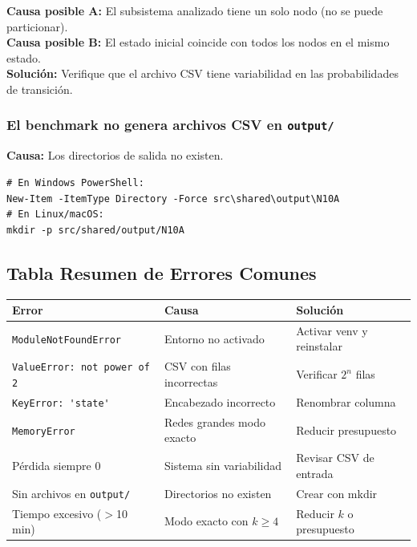 \textbf{Causa posible A:} El subsistema analizado tiene un solo nodo (no se puede particionar).\\
\textbf{Causa posible B:} El estado inicial coincide con todos los nodos en el mismo estado. \\
\textbf{Solución:} Verifique que el archivo CSV tiene variabilidad en las probabilidades de transición.

\subsubsection{El benchmark no genera archivos CSV en \texttt{output/}}

\textbf{Causa:} Los directorios de salida no existen.

\begin{lstlisting}[style=shell, caption={Crear directorios de salida manualmente.}]
# En Windows PowerShell:
New-Item -ItemType Directory -Force src\shared\output\N10A
# En Linux/macOS:
mkdir -p src/shared/output/N10A
\end{lstlisting}

\subsection{Tabla Resumen de Errores Comunes}

\begin{longtable}{p{4.5cm}p{4.5cm}p{4.5cm}}
    \toprule
    \textbf{Error} & \textbf{Causa} & \textbf{Solución} \\
    \midrule
    \endhead
    \lstinline|ModuleNotFoundError| & Entorno no activado & Activar venv y reinstalar \\[4pt]
    \lstinline|ValueError: not power of 2| & CSV con filas incorrectas & Verificar $2^n$ filas \\[4pt]
    \lstinline|KeyError: 'state'| & Encabezado incorrecto & Renombrar columna \\[4pt]
    \lstinline|MemoryError| & Redes grandes modo exacto & Reducir presupuesto \\[4pt]
    Pérdida siempre 0 & Sistema sin variabilidad & Revisar CSV de entrada \\[4pt]
    Sin archivos en \lstinline|output/| & Directorios no existen & Crear con mkdir \\[4pt]
    Tiempo excesivo ($>$10 min) & Modo exacto con $k \geq 4$ & Reducir $k$ o presupuesto \\
    \bottomrule
\end{longtable}
